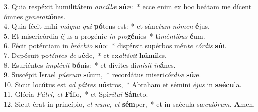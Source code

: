 3. Quia respéxit humilitátem \textit{ancíllæ} \textbf{sú}æ: * ecce enim ex hoc beátam me dícent ómnes ge\textit{nerati}\textbf{ó}nes.\\
4. Quia fécit míhi \textit{mágna qui} \textbf{pó}tens est: * et sán\textit{ctum} \textit{nómen} \textbf{é}jus.\\
5. Et misericórdia éjus a progéni\textit{e in} \textit{pro}\textbf{gé}nies * ti\textit{méntibus} \textbf{é}um.\\
6. Fécit poténtiam in \textit{bráchio} \textbf{sú}o: * dispérsit supérbos mén\textit{te} \textit{cór}\textit{dis} \textbf{sú}i.\\
7. Depósuit po\textit{téntes de} \textbf{sé}de, * et ex\textit{altávit} \textbf{húmi}les.\\
8. Esuriéntes \textit{implévit} \textbf{bó}nis: * et dívites di\textit{mísit} \textit{in}\textbf{á}nes.\\
9. Suscépit Israel \textit{púerum} \textbf{sú}um, * recordátus miseri\textit{córdiæ} \textbf{sú}æ.\\
10. Sicut locútus est \textit{ad pátres} \textbf{nó}stros, * Abraham et sémini \textit{éjus} in \textbf{saécu}la.\\
11. Glória \textit{Pátri, et} \textbf{Fí}lio, * et Spi\textit{rítui} \textbf{Sán}cto.\\
12. Sicut érat in princípio, \textit{et nunc, et} \textbf{sém}per, * et in saécula sæ\textit{culórum.} \textbf{A}men.